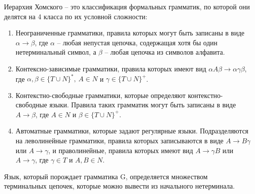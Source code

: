 \documentclass[a4paper,final]{article}
\begin{document}
Иерархия Хомского -- это классификация формальных грамматик, по которой они делятся на 4 класса по их условной сложности:
\begin{enumerate}[label=Класс \arabic*., start=0]
    \item Неограниченные грамматики, правила которых могут быть записаны в виде $\alpha \rightarrow \beta$, где $\alpha$ -- любая непустая цепочка, содержащая хотя бы один нетерминальный символ, а $\beta$ -- любая цепочка из символов алфавита.
    \item Контексно-зависимые грамматики, правила которых имеют вид $\alpha A\beta \rightarrow \alpha\gamma\beta$, где $\alpha, \beta \in \{T \cup N\}^*, ~A \in N$ и $\gamma \in \{T \cup N\}^+$.
    \item Контекстно-свободные грамматики, которые определяют контекстно-свободные языки. Правила таких грамматик могут быть записаны в виде $A \rightarrow \beta$, где $A \in N$ и $\beta \in \{T \cup N\}^+$.
    \item Автоматные грамматики, которые задают регулярные языки. Подразделяются на леволинейные грамматики, правила которых записываются в виде $A \rightarrow B\gamma$ или $A \rightarrow \gamma$, и праволинейные, правила которых имеют вид $A \rightarrow \gamma B$ или $A \rightarrow \gamma$, где $\gamma \in T$ и $A, B \in N$.
\end{enumerate}

Язык, который порождает грамматика G, определяется множеством терминальных цепочек, которые можно вывести из начального нетерминала.
\end{document}
